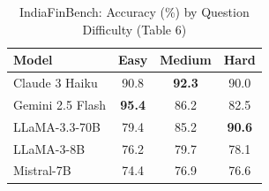 \begin{table}[h]
\centering
\caption{IndiaFinBench: Accuracy (\%) by Question Difficulty (Table 6)}
\label{tab:difficulty}
\begin{tabular}{lccc}
\toprule
Model & Easy & Medium & Hard \\
\midrule
Claude 3 Haiku & 90.8 & \textbf{92.3} & 90.0 \\
Gemini 2.5 Flash & \textbf{95.4} & 86.2 & 82.5 \\
LLaMA-3.3-70B & 79.4 & 85.2 & \textbf{90.6} \\
LLaMA-3-8B & 76.2 & 79.7 & 78.1 \\
Mistral-7B & 74.4 & 76.9 & 76.6 \\
\bottomrule
\end{tabular}
\end{table}
